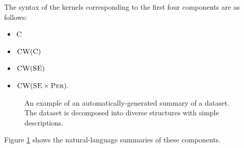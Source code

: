 \documentclass{article}
\begin{document}
The syntax of the kernels corresponding to the first four components are as follows:
\vspace{-0.5\baselineskip}
\begin{itemize}
  \itemsep0em
  \item ${\textsc{C}}$
  \item ${\textsc{CW}}({\textsc{C}})$
  \item ${\textsc{CW}}({\textsc{SE}})$
  \item ${\textsc{CW}}({\textsc{SE}} \times {\textsc{Per}}).$
\end{itemize}
\vspace{-\baselineskip}

\begin{figure}[h]
\centering
{}
\caption{
An example of an automatically-generated summary of a dataset.  The dataset is decomposed into diverse structures with simple descriptions.}
\label{fig:exec}
\end{figure}
Figure \ref{fig:exec} shows the natural-language summaries of these components.
\end{document}
